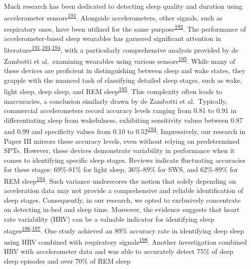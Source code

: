 \documentclass[
  10pt,
]{scrbook}
\begin{document}
Much research has been dedicated to detecting sleep quality and duration
using accelerometer
sensors\textsuperscript{\protect\hyperlink{ref-baron_2018}{191}}.
Alongside accelerometers, other signals, such as respiratory ones, have
been utilized for the same
purpose\textsuperscript{\protect\hyperlink{ref-dunn_2018}{192}}. The
performance of accelerometer-based sleep wearables has garnered
significant attention in
literature\textsuperscript{\protect\hyperlink{ref-baron_2018}{191},\protect\hyperlink{ref-danzig_2020}{193},\protect\hyperlink{ref-haghayegh_2019}{194}},
with a particularly comprehensive analysis provided by de Zambotti et
al.~examining wearables using various
sensors\textsuperscript{\protect\hyperlink{ref-dezambotti_2019}{195}}.
While many of these devices are proficient in distinguishing between
sleep and wake states, they grapple with the nuanced task of classifying
detailed sleep stages, such as wake, light sleep, deep sleep, and REM
sleep\textsuperscript{\protect\hyperlink{ref-dezambotti_2019}{195}}.
This complexity often leads to inaccuracies, a conclusion similarly
drawn by de Zambotti et al.~Typically, commercial accelerometers record
accuracy levels ranging from 0.81 to 0.91 in differentiating sleep from
wakefulness, exhibiting sensitivity values between 0.87 and 0.99 and
specificity values from 0.10 to
0.52\textsuperscript{\protect\hyperlink{ref-haghayegh_2019}{194}}.
Impressively, our research in Paper III mirrors these accuracy levels,
even without relying on predetermined SPTs. However, these devices
demonstrate variability in performance when it comes to identifying
specific sleep stages. Reviews indicate fluctuating accuracies for these
stages: 69\%-81\% for light sleep, 36\%-89\% for SWS, and 62\%-89\% for
REM sleep\textsuperscript{\protect\hyperlink{ref-haghayegh_2019}{194}}.
Such variance underscores the notion that solely depending on
acceleration data may not provide a comprehensive and reliable
identification of sleep stages. Consequently, in our research, we opted
to exclusively concentrate on detecting in-bed and sleep time. Moreover,
the evidence suggests that heart rate variability (HRV) can be a
valuable indicator for identifying sleep
stages\textsuperscript{\protect\hyperlink{ref-herzig_2018}{196},\protect\hyperlink{ref-chouchou_2014}{197}}.
One study achieved an 89\% accuracy rate in identifying deep sleep using
HRV combined with respiratory
signals\textsuperscript{\protect\hyperlink{ref-long_2017}{198}}. Another
investigation combined HRV with accelerometer data and was able to
accurately detect 75\% of deep sleep episodes and over 70\% of REM sleep
\end{document}
